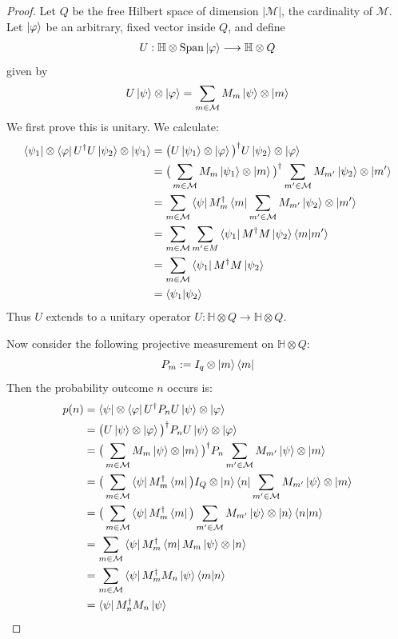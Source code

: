 \documentclass[12pt]{article}
\theoremstyle{plain}
\theoremstyle{definition}
\newcommand{\bb}[1]{\mathbb{#1}}
\newcommand{\call}[1]{\mathcal{#1}}
\newcommand{\lto}{\longrightarrow}
\begin{document}
\begin{proof}
Let $Q$ be the free Hilbert space of dimension $|\call{M}|$, the cardinality of $\call{M}$. Let $\ket{\varphi}$ be an arbitrary, fixed vector inside $Q$, and define
\begin{align*}
U: \bb{H} \otimes \operatorname{Span}\ket{\varphi} &\lto \bb{H} \otimes Q\\
\end{align*}
given by 
\begin{equation}
U\ket{\psi}\otimes \ket{\varphi} = \sum_{m \in \call{M}}M_m\ket{\psi}\otimes \ket{m}
\end{equation}
We first prove this is unitary. We calculate:
\begin{align*}
\bra{\psi_1}\otimes \bra{\varphi}U^\dagger U\ket{\psi_2}\otimes\ket{\psi_1} &= \big(U\ket{\psi_1}\otimes\ket{\varphi}\big)^\dagger U\ket{\psi_2}\otimes\ket{\varphi}\\
&= \big(\sum_{m \in \call{M}}M_m\ket{\psi_1}\otimes\ket{m}\big)^\dagger \sum_{m' \in \call{M}}M_{m'}\ket{\psi_2}\otimes\ket{m'}\\
&= \sum_{m \in \call{M}}\bra{\psi}M_m^\dagger \bra{m}\sum_{m' \in \call{M}}M_{m'}\ket{\psi_2}\otimes\ket{m'}\\
&= \sum_{m \in \call{M}}\sum_{m' \in M}\bra{\psi_1}M^\dagger M\ket{\psi_2}\bra{m}\ket{m'}\\
&= \sum_{m \in \call{M}}\bra{\psi_1}M^\dagger M\ket{\psi_2}\\
&= \bra{\psi_1}\ket{\psi_2}
\end{align*}
Thus $U$ extends to a unitary operator $U: \bb{H} \otimes Q \lto \bb{H} \otimes Q$.

Now consider the following projective measurement on $\bb{H} \otimes Q$:
\begin{equation}
P_m := I_q \otimes \ket{m}\bra{m}
\end{equation}
Then the probability outcome $n$ occurs is:
\begin{align*}
p(n) &= \bra{\psi}\otimes\bra{\varphi}U^\dagger P_n U \ket{\psi}\otimes\ket{\varphi}\\
&= \big(U\ket{\psi}\otimes\ket{\varphi}\big)^\dagger P_n U\ket{\psi}\otimes\ket{\varphi}\\
&= \big(\sum_{m\in \call{M}}M_m\ket{\psi}\otimes\ket{m}\big)^\dagger P_n \sum_{m' \in \call{M}} M_{m'}\ket{\psi}\otimes\ket{m}\\
&= \big(\sum_{m \in \call{M}}\bra{\psi}M_m^\dagger\bra{m}\big) I_Q \otimes \ket{n}\bra{n}\sum_{m' \in \call{M}}M_{m'}\ket{\psi}\otimes\ket{m}\\
&= \big(\sum_{m \in \call{M}}\bra{\psi}M_m^\dagger \bra{m}\big)\sum_{m'\in\call{M}}M_{m'}\ket{\psi}\otimes\ket{n}\bra{n}\ket{m}\\
&=\sum_{m \in \call{M}}\bra{\psi}M_m^\dagger\bra{m} M_m \ket{\psi}\otimes \ket{n}\\
&=\sum_{m \in \call{M}}\bra{\psi}M_m^\dagger M_n\ket{\psi}\bra{m}\ket{n}\\
&=\bra{\psi}M_n^\dagger M_n \ket{\psi}
\end{align*}
\end{proof}
\end{document}
